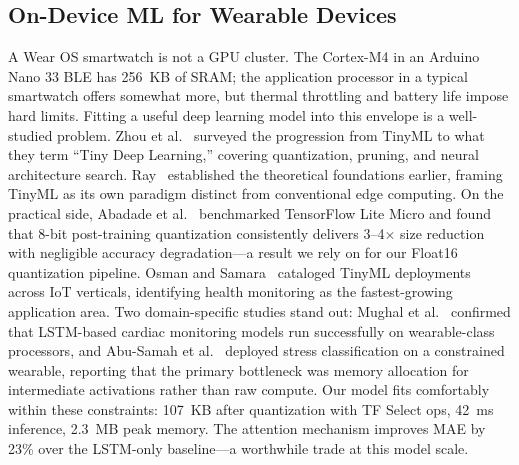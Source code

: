 \documentclass[HARVARD,Times2COL]{WileyNJDv5}
\begin{document}
\subsection{On-Device ML for Wearable Devices}
A Wear OS smartwatch is not a GPU cluster. The Cortex-M4 in an Arduino Nano 33 BLE has 256~KB of SRAM; the application processor in a typical smartwatch offers somewhat more, but thermal throttling and battery life impose hard limits. Fitting a useful deep learning model into this envelope is a well-studied problem. Zhou et al.~\citep{zhou2025tinyml} surveyed the progression from TinyML to what they term ``Tiny Deep Learning,'' covering quantization, pruning, and neural architecture search. Ray~\citep{ray2022} established the theoretical foundations earlier, framing TinyML as its own paradigm distinct from conventional edge computing.
On the practical side, Abadade et al.~\citep{abadade2023} benchmarked TensorFlow Lite Micro and found that 8-bit post-training quantization consistently delivers 3--4$\times$ size reduction with negligible accuracy degradation---a result we rely on for our Float16 quantization pipeline. Osman and Samara~\citep{osman2024} cataloged TinyML deployments across IoT verticals, identifying health monitoring as the fastest-growing application area. Two domain-specific studies stand out: Mughal et al.~\citep{mughal2025} confirmed that LSTM-based cardiac monitoring models run successfully on wearable-class processors, and Abu-Samah et al.~\citep{abusamah2025} deployed stress classification on a constrained wearable, reporting that the primary bottleneck was memory allocation for intermediate activations rather than raw compute.
Our model fits comfortably within these constraints: 107~KB after quantization with TF Select ops, 42~ms inference, 2.3~MB peak memory. The attention mechanism improves MAE by 23\% over the LSTM-only baseline---a worthwhile trade at this model scale.
\end{document}
